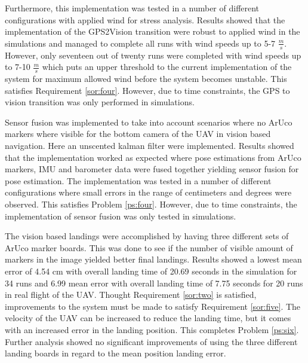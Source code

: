 \documentclass[../Head/report.tex]{subfiles}
\begin{document}
Furthermore, this implementation was tested in a number of different configurations with applied wind for stress analysis. Results showed that the implementation of the GPS2Vision transition were robust to applied wind in the simulations and managed to complete all runs with wind speeds up to 5-7 $\frac{m}{s}$. However, only seventeen out of twenty runs were completed with wind speeds up to 7-10 $\frac{m}{s}$ which puts an upper threshold to the current implementation of the system for maximum allowed wind before the system becomes unstable. This satisfies Requirement \ref{sor:four}. However, due to time constraints, the GPS to vision transition was only performed in simulations. 

Sensor fusion was implemented to take into account scenarios where no ArUco markers where visible for the bottom camera of the UAV in vision based navigation. Here an unscented kalman filter were implemented. Results showed that the implementation worked as expected where pose estimations from ArUco markers, IMU and barometer data were fused together yielding sensor fusion for pose estimation. The implementation was tested in a number of different configurations where small errors in the range of centimeters and degrees were observed. This satisfies Problem \ref{ps:four}. However, due to time constraints, the implementation of sensor fusion was only tested in simulations.

The vision based landings were accomplished by having three different sets of ArUco marker boards. This was done to see if the number of visible amount of markers in the image yielded better final landings. Results showed a lowest mean error of 4.54 cm with overall landing time of 20.69 seconds in the simulation for 34 runs and 6.99 mean error with overall landing time of 7.75 seconds for 20 runs in real flight of the UAV. Thought Requirement \ref{sor:two} is satisfied, improvements to the system must be made to satisfy Requirement \ref{sor:five}. The velocity of the UAV can be increased to reduce the landing time, but it comes with an increased error in the landing position. This completes Problem \ref{ps:six}. Further analysis showed no significant improvements of using the three different landing boards in regard to the mean position landing error.
\end{document}
